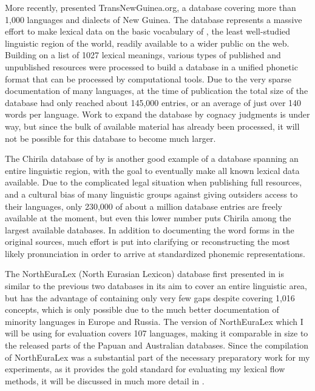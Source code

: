 More recently, \citet{greenhill2015} presented TransNewGuinea.org, a database covering more than 1,000 languages and dialects of New Guinea. The database represents a massive effort to make lexical data on the basic vocabulary of , the least well-studied linguistic region of the world, readily available to a wider public on the web. Building on a list of 1027 lexical meanings, various types of published and unpublished resources were processed to build a database in a unified phonetic format that can be processed by computational tools. Due to the very sparse documentation of many languages, at the time of publication the total size of the database had only reached about 145,000 entries, or an average of just over 140 words per language. Work to expand the database by cognacy judgments is under way, but since the bulk of available material has already been processed, it will not be possible for this database to become much larger.

The Chirila database of  by \citet{bowern2016} is another good example of a database spanning an entire linguistic region, with the goal to eventually make all known lexical data available. Due to the complicated legal situation when publishing full resources, and a cultural bias of many linguistic groups against giving outsiders access to their languages, only 230,000 of about a million database entries are freely available at the moment, but even this lower number puts Chirila among the largest available databases. In addition to documenting the word forms in the original sources, much effort is put into clarifying or reconstructing the most likely pronunciation in order to arrive at standardized phonemic representations.

The NorthEuraLex (North Eurasian Lexicon) database first presented in \citet{dellert2015a} is similar to the previous two databases in its aim to cover an entire linguistic area, but has the advantage of containing only very few gaps despite covering 1,016 concepts, which is only possible due to the much better documentation of minority languages in Europe and Russia. The version of NorthEuraLex which I will be using for evaluation covers 107 languages, making it comparable in size to the released parts of the Papuan and Australian databases. Since the compilation of NorthEuraLex was a substantial part of the necessary preparatory work for my experiments, as it provides the gold standard for evaluating my lexical flow methods, it will be discussed in much more detail in .

